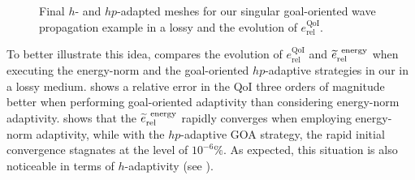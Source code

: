 \pagebreak

\begin{figure}
  \caption{Final $h$- and $hp$-adapted meshes for our singular goal-oriented wave propagation example in a lossy  and the evolution of $e_{\textrm{rel}}^{\textrm{QoI}}$.}
  \label{fig:Helm2DGOA}
\end{figure}

\pagebreak

\noindent To better illustrate this idea,  compares the evolution of $e_{\textrm{rel}}^{\textrm{QoI}}$ and $\tilde{e}_{\textrm{rel}}^{\textrm{\, energy}}$ when executing the energy-norm and the goal-oriented $hp$-adaptive strategies in our  in a lossy medium.  shows a relative error in the QoI three orders of magnitude better when performing goal-oriented adaptivity than considering energy-norm adaptivity.  shows that the $\tilde{e}_{\textrm{rel}}^{\textrm{\, energy}}$ rapidly converges when employing energy-norm adaptivity, while with the $hp$-adaptive GOA strategy, the rapid initial convergence stagnates at the level of $10^{-6} \%$. As expected, this situation is also noticeable in terms of $h$-adaptivity (see ).

